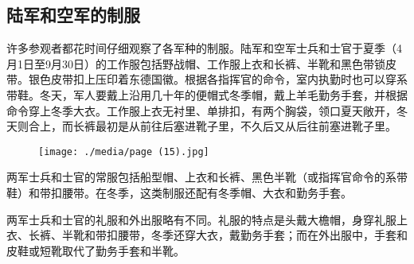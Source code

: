 \subsection{陆军和空军的制服}

许多参观者都花时间仔细观察了各军种的制服。陆军和空军士兵和士官于夏季（4月1日至9月30日）的工作服包括野战帽、工作服上衣和长裤、半靴和黑色带锁皮带。银色皮带扣上压印着东德国徽。根据各指挥官的命令，室内执勤时也可以穿系带鞋。冬天，军人要戴上沿用几十年的便帽式冬季帽，戴上羊毛勤务手套，并根据命令穿上冬季大衣。工作服上衣无衬里、单排扣，有两个胸袋，领口夏天敞开，冬天则合上，而长裤最初是从前往后塞进靴子里，不久后又从后往前塞进靴子里。

\begin{figure}
\texttt{[image: ./media/page (15).jpg]}
\end{figure}

两军士兵和士官的常服包括船型帽、上衣和长裤、黑色半靴（或指挥官命令的系带鞋）和带扣腰带。在冬季，这类制服还配有冬季帽、大衣和勤务手套。

两军士兵和士官的礼服和外出服略有不同。礼服的特点是头戴大檐帽，身穿礼服上衣、长裤、半靴和带扣腰带，冬季还穿大衣，戴勤务手套；而在外出服中，手套和皮鞋或短靴取代了勤务手套和半靴。

